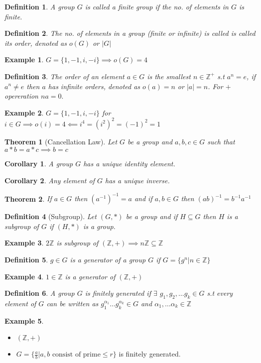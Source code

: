 \documentclass[12pt,a4paper]{article}
\newcommand{\Z}{\mathbb{Z}}
\newtheorem{thm}{Theorem}
\newtheorem{defn}{Definition}
\newtheorem{cor}{Corollary}
\newtheorem{ex}{Example}
\begin{document}
\begin{defn}
	A group $G$ is called a finite group if the no. of elements in $G$ is finite.
\end{defn}
\begin{defn}
	The no. of elements in a group (finite or infinite) is called is called its order, denoted as $o(G)$ or $|G|$
\end{defn}
\begin{ex}
	$G=\{1,-1,i,-i\} \implies o(G)=4$ 
\end{ex}
\begin{defn}
	The order of an element $a \in G$ is the smallest $n \in \Z^+$ s.t $a^n=e$, if $a^n \ne e$ then $a$ has infinite orders, denoted as $o(a)=n$ or $|a|=n$. For $+$ opereration $na=0.$
\end{defn}
\begin{ex}
	$G=\{1,-1,i,-i\}$ for $i \in G \implies o(i)=4 \impliedby i^4=(i^2)^2=(-1)^2=1$
\end{ex}

\begin{thm}[Cancellation Law]
	  Let $G$ be a group and $a,b,c\in G$ such that $a*b=a*c \implies b=c$
\end{thm}
\begin{cor}
	A group $G$ has a unique identity element.
\end{cor}
\begin{cor}
	Any element of $G$ has a unique inverse.
\end{cor}
\begin{thm} 
	If $a\in G$ then $(a^{-1})^{-1}=a$ and if $a,b\in G$ then $(ab)^{-1}=b^{-1}a^{-1}$
\end{thm}

\begin{defn}[Subgroup]
	Let $(G,*)$ be a group and if $H \subseteq G$ then $H$ is a subgroup of $G$ if $(H,*)$ is a group.
\end{defn}
\begin{ex}
	$2\Z$ is subgroup of $(\Z, +) \implies n\Z \subseteq \Z$
\end{ex}
\begin{defn}
	$g\in G$ is a generator of a group $G$ if $G=\{g^n | n\in \Z\}$
\end{defn}
\begin{ex}
	$1 \in \Z$ is a generator of $(\Z, +)$
\end{ex}

\begin{defn}
	A group $G$ is finitely generated if $\exists$ $g_{1},g_{2},\dots g_{k}\in G$ s.t every element of $G$ can be written as $g_{1}^{{\alpha}_{1}} \dots g_{k}^{{\alpha}_{k}} \in G  $ and $\alpha_{1}, \dots \alpha_{k} \in \Z$
\end{defn}
\begin{ex}
\end{ex}	
\begin{itemize}
	\item $(\Z, +)$
	\item $G = \{\frac{a}{b} | a,b \text{ consist of prime} \le r\}$ is finitely generated.
\end{itemize}
\end{document}
